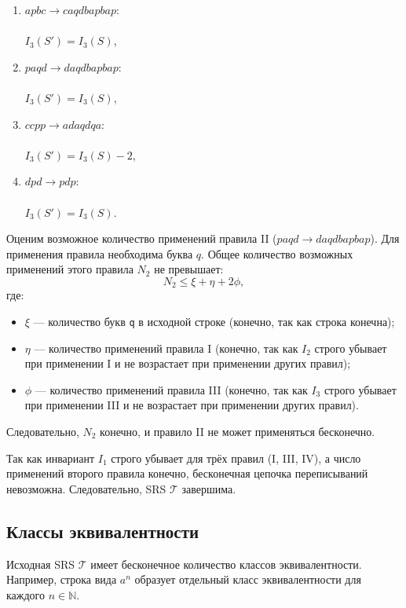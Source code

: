\documentclass[a4paper,12pt]{article}
\newcommand{\T}{\mathcal{T}}
\begin{document}
\begin{enumerate}[label=\Roman*.]
    \item $apbc \rightarrow caqdbapbap$: \\\\
        $I_3(S') = I_3(S)$,
    \item $paqd \rightarrow daqdbapbap$: \\\\
        $I_3(S') = I_3(S)$,
    \item $ccpp \rightarrow adaqdqa$: \\\\
        $I_3(S') = I_3(S) - 2$,
    \item $dpd \rightarrow pdp$: \\\\
        $I_3(S') = I_3(S)$.
\end{enumerate}

Оценим возможное количество применений правила II ($paqd \rightarrow daqdbapbap$). Для применения правила необходима буква $q$.  
Общее количество возможных применений этого правила $N_2$ не превышает:
\[
N_2 \le \xi + \eta + 2 \phi,
\]
где:
\begin{itemize}
    \item $\xi$ — количество букв \texttt{q} в исходной строке (конечно, так как строка конечна);
    \item $\eta$ — количество применений правила I (конечно, так как $I_2$ строго убывает при применении I и не возрастает при применении других правил);
    \item $\phi$ — количество применений правила III (конечно, так как $I_3$ строго убывает при применении III и не возрастает при применении других правил).
\end{itemize}

Следовательно, $N_2$ конечно, и правило II не может применяться бесконечно.

Так как инвариант $I_1$ строго убывает для трёх правил (I, III, IV), а число применений второго правила конечно, бесконечная цепочка переписываний невозможна. Следовательно, SRS $\T$ завершима.

\subsection{Классы эквивалентности}

Исходная SRS $\mathcal{T}$ имеет бесконечное количество классов эквивалентности. Например, строка вида $a^n$ образует отдельный класс эквивалентности для каждого $n \in \mathbb{N}$.
\end{document}

